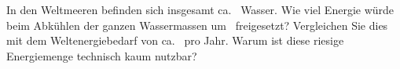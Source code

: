 In den Weltmeeren befinden sich insgesamt ca. \mMO\ Wasser. Wie viel Energie würde beim Abkühlen der ganzen Wassermassen um \dTO\ freigesetzt? Vergleichen Sie dies mit dem Weltenergiebedarf von ca. \EwO\ pro Jahr. Warum ist diese riesige Energiemenge technisch kaum nutzbar?
